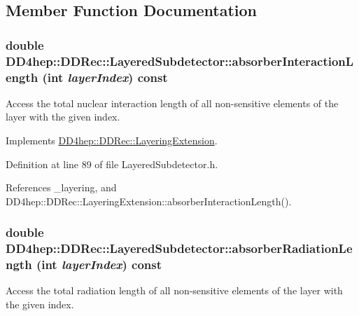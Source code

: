 \subsection{Member Function Documentation}
\hypertarget{class_d_d4hep_1_1_d_d_rec_1_1_layered_subdetector_a89a172816ccb10e28a0f7dd8c150bc89}{
\subsubsection[{absorberInteractionLength}]{\setlength{\rightskip}{0pt plus 5cm}double DD4hep::DDRec::LayeredSubdetector::absorberInteractionLength (int {\em layerIndex}) const}}
\label{class_d_d4hep_1_1_d_d_rec_1_1_layered_subdetector_a89a172816ccb10e28a0f7dd8c150bc89}


Access the total nuclear interaction length of all non-\/sensitive elements of the layer with the given index. 

Implements \hyperlink{class_d_d4hep_1_1_d_d_rec_1_1_layering_extension_af18b1293c0631bd55798e7c73eddeb6b}{DD4hep::DDRec::LayeringExtension}.

Definition at line 89 of file LayeredSubdetector.h.

References \_\-layering, and DD4hep::DDRec::LayeringExtension::absorberInteractionLength().\hypertarget{class_d_d4hep_1_1_d_d_rec_1_1_layered_subdetector_a839b11ff32fe856b842cf26729cdb655}{
\subsubsection[{absorberRadiationLength}]{\setlength{\rightskip}{0pt plus 5cm}double DD4hep::DDRec::LayeredSubdetector::absorberRadiationLength (int {\em layerIndex}) const}}
\label{class_d_d4hep_1_1_d_d_rec_1_1_layered_subdetector_a839b11ff32fe856b842cf26729cdb655}


Access the total radiation length of all non-\/sensitive elements of the layer with the given index. 

